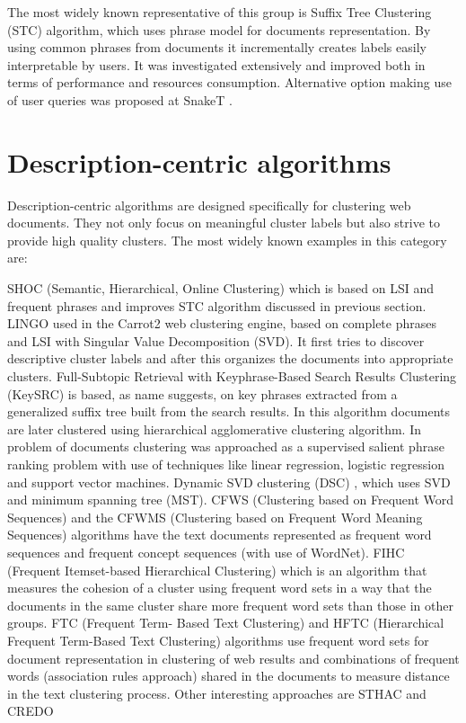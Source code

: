 \documentclass[a4paper, 12pt, oneside]{Thesis} %
\begin{document}
The most widely known representative of this group is Suffix Tree Clustering (STC) \cite{zamir1998web} algorithm, which uses phrase model for documents representation. By using common phrases from documents it incrementally creates labels easily interpretable by users. It was investigated extensively and improved both in terms of performance and resources consumption. Alternative option making use of user queries was proposed at SnakeT \cite{ferragina2008personalized}. 

\section{Description-centric algorithms} Description-centric algorithms are designed specifically for clustering web documents. They not only focus on meaningful cluster labels but also strive to provide high quality clusters. The most widely known examples in this category are:

SHOC \cite{zhang2004semantic} (Semantic, Hierarchical, Online Clustering) which is based on LSI and frequent phrases and improves STC algorithm discussed in previous section.
LINGO \cite{osinski2004lingo} used in the Carrot2 web clustering engine, based on complete phrases and LSI with Singular Value Decomposition (SVD). It first tries to discover descriptive cluster labels and after this organizes the documents into appropriate clusters.
Full-Subtopic Retrieval with Keyphrase-Based Search Results Clustering (KeySRC) \cite{bernardini2009full} is based, as name suggests, on key phrases extracted from a generalized suffix tree built from the search results. In this algorithm documents are later clustered using hierarchical agglomerative clustering algorithm. 
In \cite{zeng2004learning} problem of documents clustering was approached as a supervised salient phrase ranking problem with use of techniques like linear regression, logistic regression and support vector machines.
Dynamic SVD clustering (DSC) \cite{mecca2007new}, which uses SVD and minimum spanning tree (MST).
CFWS (Clustering based on Frequent Word Sequences) and the CFWMS (Clustering based on Frequent Word Meaning Sequences) algorithms \cite{li2008text} have the text documents represented as frequent word sequences and frequent concept sequences (with use of WordNet). 
FIHC (Frequent Itemset-based Hierarchical Clustering) \cite{fung2003hierarchical}  which is an algorithm that measures the cohesion of a cluster using frequent word sets in a way that the documents in the same cluster share more frequent word sets than those in other groups. 
FTC (Frequent Term- Based Text Clustering) and HFTC (Hierarchical Frequent Term-Based Text Clustering) algorithms \cite{beil2002frequent} use frequent word sets for document representation in clustering of web results and combinations of frequent words (association rules approach) shared in the documents to measure distance in the text clustering process.
Other interesting approaches are STHAC \cite{worawitphinyo2011improving} and CREDO \cite{carpineto2004exploiting}
\end{document}
